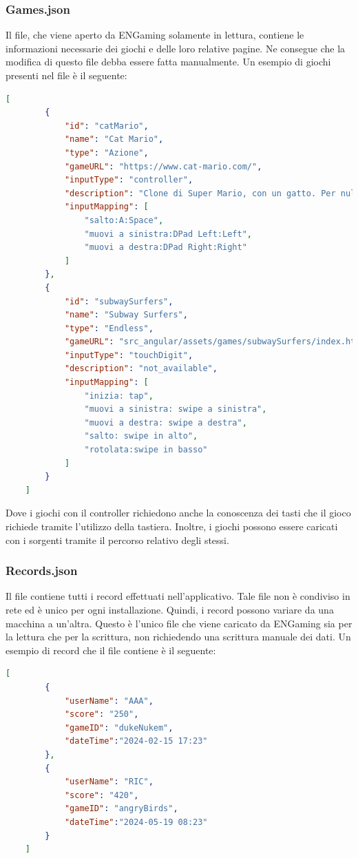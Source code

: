 \subsubsection{Games.json}
Il file, che viene aperto da ENGaming solamente in lettura, contiene le informazioni necessarie dei giochi e delle loro relative pagine. Ne consegue che la modifica di questo file debba essere fatta manualmente.
Un esempio di giochi presenti nel file è il seguente:
\begin{lstlisting}[language=json,firstnumber=1]
    [
        {
            "id": "catMario",
            "name": "Cat Mario",
            "type": "Azione",
            "gameURL": "https://www.cat-mario.com/",
            "inputType": "controller",
            "description": "Clone di Super Mario, con un gatto. Per nulla stressante!",
            "inputMapping": [
                "salto:A:Space",
                "muovi a sinistra:DPad Left:Left",
                "muovi a destra:DPad Right:Right"
            ]
        },
        {
            "id": "subwaySurfers",
            "name": "Subway Surfers",
            "type": "Endless",
            "gameURL": "src_angular/assets/games/subwaySurfers/index.html",
            "inputType": "touchDigit",
            "description": "not_available",
            "inputMapping": [
                "inizia: tap",
                "muovi a sinistra: swipe a sinistra",
                "muovi a destra: swipe a destra",
                "salto: swipe in alto",
                "rotolata:swipe in basso"
            ]
        }
    ]
\end{lstlisting}
Dove i giochi con il controller richiedono anche la conoscenza dei tasti che il gioco richiede tramite l'utilizzo della tastiera.
Inoltre, i giochi possono essere caricati con i sorgenti tramite il percorso relativo degli stessi.
\newpage
\subsubsection{Records.json}
Il file contiene tutti i record effettuati nell'applicativo. Tale file non è condiviso in rete ed è unico per ogni installazione. Quindi, i record possono variare da una macchina a un'altra.
Questo è l'unico file che viene caricato da ENGaming sia per la lettura che per la scrittura, non richiedendo una scrittura manuale dei dati.
Un esempio di record che il file contiene è il seguente:
\begin{lstlisting}[language=json,firstnumber=1]
    [
        {
            "userName": "AAA",
            "score": "250",
            "gameID": "dukeNukem",
            "dateTime":"2024-02-15 17:23"
        },
        {
            "userName": "RIC",
            "score": "420",
            "gameID": "angryBirds",
            "dateTime":"2024-05-19 08:23"
        }
    ]
\end{lstlisting}
